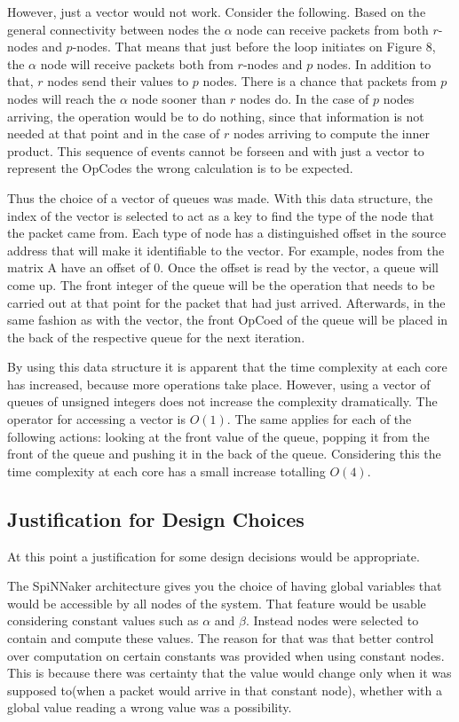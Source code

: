 \documentclass[12pt,a4paper]{article}
\begin{document}
However, just a vector would not work. Consider the following. Based on the general connectivity between nodes the $\alpha$ node can receive packets from both $r$-nodes and $p$-nodes. That means that just before the loop initiates on Figure 8, the $\alpha$ node will receive packets both from $r$-nodes and $p$ nodes. In addition to that, $r$ nodes send their values to $p$ nodes. There is a chance that packets from $p$ nodes will reach the $\alpha$ node sooner than $r$ nodes do. In the case of $p$ nodes arriving, the operation would be to do nothing, since that information is not needed at that point and in the case of $r$ nodes arriving to compute the inner product.  This sequence of events cannot be forseen and with just a vector to represent the OpCodes the wrong calculation is to be expected.

Thus the choice of a vector of queues was made. With this data structure, the index of the vector is selected to act as a key to find the type of the node that the packet came from. Each type of node has a distinguished offset in the source address that will make it identifiable to the vector. For example, nodes from the matrix A have an offset of 0. Once the offset is read by the vector, a queue will come up. The front integer of the queue will be the operation that needs to be carried out at that point for the packet that had just arrived. Afterwards, in the same fashion as with the vector, the front OpCoed of the queue will be placed in the back of the respective queue for the next iteration.

By using this data structure it is apparent that the time complexity at each core has increased, because more operations take place. However, using a vector of queues of unsigned integers does not increase the complexity dramatically. The operator for accessing a vector is $O(1)$. The same applies for each of the following actions: looking at the front value of the queue, popping it from the front of the queue and pushing it in the back of the queue. Considering this the time complexity at each core has a small increase totalling $O(4)$.
\subsection{Justification for Design Choices}
At this point a justification for some design decisions would be appropriate. 

The SpiNNaker architecture gives you the choice of having global variables that would be accessible by all nodes of the system. That feature would be usable considering constant values such as $\alpha$ and $\beta$. Instead nodes were selected to contain and compute these values. The reason for that was that better control over computation on certain constants was provided when using constant nodes. This is because there was certainty that the value would change only when it was supposed to(when a packet would arrive in that constant node), whether with a global value reading a wrong value was a possibility.
\end{document}
